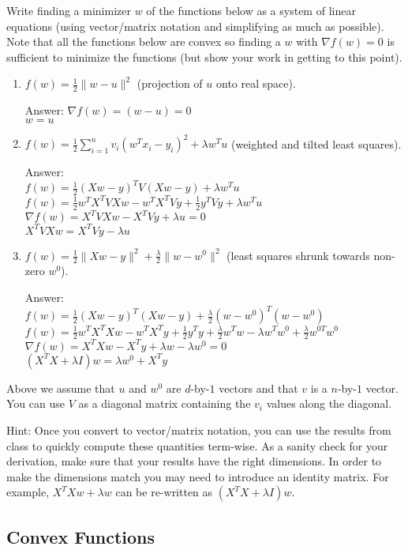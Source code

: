 \documentclass{article}
\newcommand{\blu}[1]{{\textcolor{blu}{#1}}}
\newcommand{\gre}[1]{\textcolor{gre}{#1}}
\newcommand\ans[1]{\par\gre{Answer: #1}}
\newcommand{\norm}[1]{\lVert #1 \rVert}
\begin{document}
Write finding a minimizer $w$ of the functions below as a system of linear equations (using vector/matrix notation and simplifying as much as possible). Note that all the functions below are convex  so finding a $w$ with $\nabla f(w) = 0$ is sufficient to minimize the functions (but show your work in getting to this point).
\blu{\begin{enumerate}
\item $f(w) = \frac{1}{2}\norm{w-u}^2$ (projection of $u$ onto real space).
\ans{
$\nabla f(w)= (w-u)=0$
\\$w = u$
}
\item $f(w)= \frac{1}{2}\sum_{i=1}^n v_i (w^Tx_i - y_i)^2 + \lambda w^Tu$ (weighted and tilted least squares).
\ans{\\
$f(w)=\frac{1}{2}(Xw-y)^TV(Xw-y)+\lambda w^Tu$\\
$f(w)=\frac{1}{2}w^TX^TVXw-w^TX^TVy+\frac{1}{2}y^TVy+\lambda w^Tu$\\
$\nabla f(w)=X^TVXw-X^TVy+\lambda u=0$\\
$X^TVXw=X^TVy-\lambda u$
}
\item $f(w) = \frac{1}{2}\norm{Xw - y}^2 + \frac{\lambda}{2}\norm{w-w^0}^2$ (least squares shrunk towards non-zero $w^0$).
\ans{\\
$f(w)=\frac{1}{2}(Xw-y)^T(Xw-y)+\frac{\lambda}{2} (w-w^0)^T(w-w^0)$\\
$f(w)=\frac{1}{2}w^TX^TXw-w^TX^Ty+\frac{1}{2}y^Ty+\frac{\lambda}{2} w^Tw-\lambda w^Tw^0+\frac{\lambda}{2}w^{0T}w^0$\\
$\nabla f(w)=X^TXw-X^Ty+\lambda w-\lambda w^0=0$\\
$(X^TX+\lambda I)w=\lambda w^0 + X^Ty$
}
\end{enumerate}}

Above we assume that $u$ and $w^0$ are $d$-by-$1$ vectors and that $v$ is a $n$-by-$1$ vector. You can use $V$ as a diagonal matrix containing the $v_i$ values along the diagonal.

Hint: Once you convert to vector/matrix notation, you can use the results from class to quickly compute these quantities term-wise.
As a sanity check for your derivation, make sure that your results have the right dimensions. In order to make the dimensions match you may need to introduce an identity matrix. For example, $X^TXw + \lambda w$ can be re-written as $(X^TX + \lambda I)w$.

\pagebreak

\subsection{Convex Functions}
\end{document}
